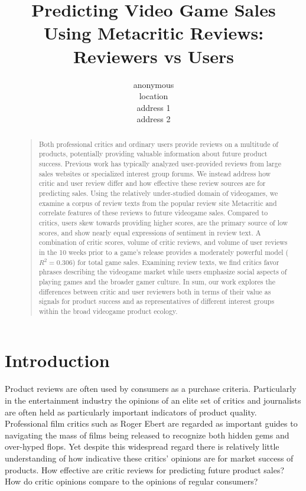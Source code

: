 \documentclass[letterpaper]{article}
\begin{document}
%
\title{Predicting Video Game Sales Using Metacritic Reviews:\\Reviewers vs Users}
\author{anonymous\\
location\\
address 1\\
address 2\\
}
\maketitle

\begin{abstract}
\begin{quote}
Both professional critics and ordinary users provide reviews on a multitude of products, potentially providing valuable information about future product success. Previous work has typically analyzed user-provided reviews from large sales websites or specialized interest group forums. We instead address how critic and user review differ and how effective these review sources are for predicting sales. Using the relatively under-studied domain of videogames, we examine a corpus of review texts from the popular review site Metacritic and correlate features of these reviews to future videogame sales. Compared to critics, users skew towards providing higher scores, are the primary source of low scores, and show nearly equal expressions of sentiment in review text. A combination of critic scores, volume of critic reviews, and volume of user reviews in the 10 weeks prior to a game's release provides a moderately powerful model ($R^2 = 0.306$) for total game sales. Examining review texts, we find critics favor phrases describing the videogame market while users emphasize social aspects of playing games and the broader gamer culture. In sum, our work explores the differences between critic and user reviewers both in terms of their value as signals for product success and as representatives of different interest groups within the broad videogame product ecology.
\end{quote}
\end{abstract}


\section{Introduction}
Product reviews are often used by consumers as a purchase criteria. Particularly in the entertainment industry the opinions of an elite set of critics and journalists are often held as particularly important indicators of product quality. Professional film critics such as Roger Ebert are regarded as important guides to navigating the mass of films being released to recognize both hidden gems and over-hyped flops. Yet despite this widespread regard there is relatively little understanding of how indicative these critics' opinions are for market success of products. How effective are critic reviews for predicting future product sales? How do critic opinions compare to the opinions of regular consumers?
\end{document}
